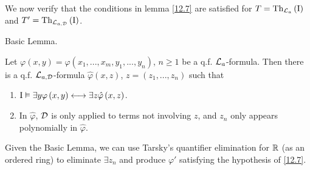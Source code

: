 We now verify that the conditions in lemma \eqref{12.7} are
satisfied for $T=\mathrm{Th}_{\mathcal{L}_{a}}\left(\mathrm{I}\right)$ and $T'=\mathrm{Th}_{\mathcal{L}_{a,\mathcal{D}}}\left(\mathrm{I}\right)$.
\begin{lem*}
\label{12.8} Basic Lemma.

Let $\varphi\left(x,y\right)=\varphi\left(x_{1},...,x_{m},y_{1},...,y_{n}\right)$,
$n\geq1$ be a q.f. $\mathcal{L}_{a}$-formula. Then there is a q.f. $\mathcal{L}_{a,\mathcal{D}}$-formula
$\hat{\varphi}\left(x,z\right)$, $z=\left(z_{1},...,z_{n}\right)$
such that
\begin{enumerate}
\item $\mathrm{I}\vDash\exists y\varphi\left(x,y\right)\longleftrightarrow\exists z\hat{\varphi}\left(x,z\right)$.
\item In $\hat{\varphi}$, $\mathcal{D}$ is only applied to terms not involving
$z$, and $z_{n}$ only appears polynomially in $\hat{\varphi}$.
\end{enumerate}
\end{lem*}
Given the Basic Lemma, we can use Tarsky's quantifier elimination
for $\mathbb{R}$ (as an ordered ring) to eliminate $\exists z_{n}$ and produce
$\varphi'$ satisfying the hypothesis of \eqref{12.7}.

